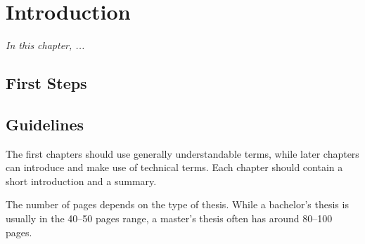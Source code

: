 \documentclass[
	12pt,
	a4paper,
	abstract,
	bibliography=totoc,
	chapterprefix,
	headings=openright,
	numbers=endperiod,
	parskip=half,
	twoside,
]{scrreprt}
\title{\parcioTitle}
\author{
\parcioName\\
{\large\href{mailto:\parcioEmail}{\nolinkurl{\parcioEmail}}}
}
\date{\today}
\makeatletter
\newcommand{\parcioTitle}{Title}
\newcommand{\parcioName}{Author Name}
\newcommand{\parcioEmail}{author@ovgu.de}
\makeatother
\begin{document}
{}

\maketitle

\begin{abstract}
\lipsum[1]

This thesis template is available at \url{https://github.com/parcio/templates} and consists of \cref{cha:introduction,cha:background,cha:evaluation,cha:conclusion}.
It also contains \cref{cha:appendix}.
\end{abstract}

\tableofcontents

\cleardoubleoddpage
{}

\chapter{Introduction}
\label{cha:introduction}

\textit{In this chapter, ...}

\section{First Steps}


\section{Guidelines}

The first chapters should use generally understandable terms, while later chapters can introduce and make use of technical terms.
Each chapter should contain a short introduction and a summary.

The number of pages depends on the type of thesis.
While a bachelor's thesis is usually in the 40--50 pages range, a master's thesis often has around 80--100 pages.
\end{document}
